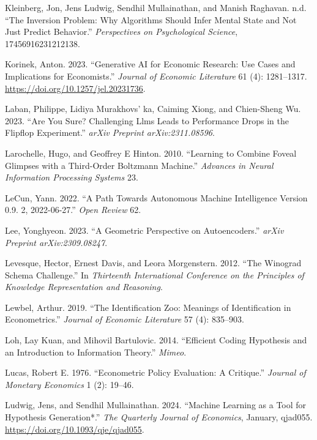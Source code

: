 \documentclass[
]{article}
\newlength{\cslhangindent}
\newenvironment{CSLReferences}[2] %
 {\begin{list}{}{%
  \setlength{\itemindent}{0pt}
  \setlength{\leftmargin}{0pt}
  \setlength{\parsep}{0pt}
  \ifodd #1
   \setlength{\leftmargin}{\cslhangindent}
   \setlength{\itemindent}{-1\cslhangindent}
  \fi
  \setlength{\itemsep}{#2\baselineskip}}}
 {\end{list}}
\begin{document}
\begin{CSLReferences}{1}{0}
Kleinberg, Jon, Jens Ludwig, Sendhil Mullainathan, and Manish Raghavan.
n.d. {``The Inversion Problem: Why Algorithms Should Infer Mental State
and Not Just Predict Behavior.''} \emph{Perspectives on Psychological
Science}, 17456916231212138.

Korinek, Anton. 2023. {``Generative AI for Economic Research: Use Cases
and Implications for Economists.''} \emph{Journal of Economic
Literature} 61 (4): 1281--1317.
\url{https://doi.org/10.1257/jel.20231736}.

Laban, Philippe, Lidiya Murakhovs' ka, Caiming Xiong, and Chien-Sheng
Wu. 2023. {``Are You Sure? Challenging Llms Leads to Performance Drops
in the Flipflop Experiment.''} \emph{arXiv Preprint arXiv:2311.08596}.

Larochelle, Hugo, and Geoffrey E Hinton. 2010. {``Learning to Combine
Foveal Glimpses with a Third-Order Boltzmann Machine.''} \emph{Advances
in Neural Information Processing Systems} 23.

LeCun, Yann. 2022. {``A Path Towards Autonomous Machine Intelligence
Version 0.9. 2, 2022-06-27.''} \emph{Open Review} 62.

Lee, Yonghyeon. 2023. {``A Geometric Perspective on Autoencoders.''}
\emph{arXiv Preprint arXiv:2309.08247}.

Levesque, Hector, Ernest Davis, and Leora Morgenstern. 2012. {``The
Winograd Schema Challenge.''} In \emph{Thirteenth International
Conference on the Principles of Knowledge Representation and Reasoning}.

Lewbel, Arthur. 2019. {``The Identification Zoo: Meanings of
Identification in Econometrics.''} \emph{Journal of Economic Literature}
57 (4): 835--903.

Loh, Lay Kuan, and Mihovil Bartulovic. 2014. {``Efficient Coding
Hypothesis and an Introduction to Information Theory.''} \emph{Mimeo}.

Lucas, Robert E. 1976. {``Econometric Policy Evaluation: A Critique.''}
\emph{Journal of Monetary Economics} 1 (2): 19--46.

Ludwig, Jens, and Sendhil Mullainathan. 2024. {``{Machine Learning as a
Tool for Hypothesis Generation*}.''} \emph{The Quarterly Journal of
Economics}, January, qjad055. \url{https://doi.org/10.1093/qje/qjad055}.


\end{CSLReferences}
\end{document}
